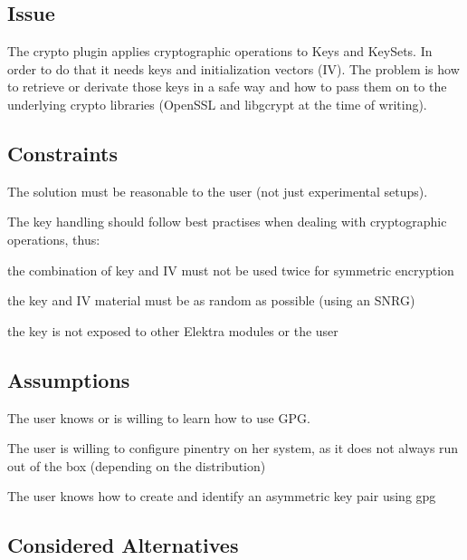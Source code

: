 \subsection*{Issue}

The crypto plugin applies cryptographic operations to Keys and Key\+Sets. In order to do that it needs keys and initialization vectors (IV). The problem is how to retrieve or derivate those keys in a safe way and how to pass them on to the underlying crypto libraries (Open\+S\+SL and libgcrypt at the time of writing).

\subsection*{Constraints}

The solution must be reasonable to the user (not just experimental setups).

The key handling should follow best practises when dealing with cryptographic operations, thus\+:


\begin{DoxyItemize}
\item the combination of key and IV must not be used twice for symmetric encryption
\item the key and IV material must be as random as possible (using an S\+N\+RG)
\item the key is not exposed to other Elektra modules or the user
\end{DoxyItemize}

\subsection*{Assumptions}


\begin{DoxyItemize}
\item The user knows or is willing to learn how to use G\+PG.
\item The user is willing to configure {\ttfamily pinentry} on her system, as it does not always run out of the box (depending on the distribution)
\item The user knows how to create and identify an asymmetric key pair using {\ttfamily gpg}
\end{DoxyItemize}

\subsection*{Considered Alternatives}

